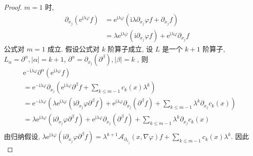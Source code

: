 \documentclass[11pt]{ctexart}[UTF8]
\begin{document}
\begin{proof}
    $m=1$ 时, 
    \begin{equation*}
        \begin{aligned}
            \partial_{x_j} \left( \mathrm{e}^{\mathrm{i} \lambda \varphi} f \right) & = \mathrm{e}^{\mathrm{i} \lambda \varphi} \left( \mathrm{i} \lambda \partial_{x_j} \varphi f + \partial_{x_j} f \right) \\
            & = \lambda \mathrm{e}^{\mathrm{i} \lambda \varphi} \left( \mathrm{i} \partial_{x_j} \varphi f \right) + \mathrm{e}^{\mathrm{i} \lambda \varphi} \partial_{x_j} f
        \end{aligned}
    \end{equation*}
    公式对 $m=1$ 成立. 假设公式对 $k$ 阶算子成立, 设 $L$ 是一个 $k+1$ 阶算子, $L_{\alpha} = \partial^{\alpha}, |\alpha| = k+1$,
     $\partial^{\alpha} = \partial_{x_{j}}(\partial^{\beta}), |\beta| = k$ , 则
    \begin{equation*}        
        \begin{aligned}
            &\mathrm{e}^{-\mathrm{i} \lambda \varphi} \partial^{\alpha} \left( \mathrm{e}^{\mathrm{i} \lambda \varphi} f \right) \\
            & = \mathrm{e}^{-\mathrm{i} \lambda \varphi} \partial_{x_{j}} \left( \mathrm{e}^{\mathrm{i} \lambda \varphi} \partial^{\beta} f + \sum\limits_{k \leq m-1} c_{k}(x) \lambda^k \right) \\
            & = \mathrm{e}^{-\mathrm{i} \lambda \varphi} \left( \lambda \mathrm{e}^{\mathrm{i} \lambda \varphi} \left( \mathrm{i} \partial_{x_j} \varphi \partial^{\beta} f \right) + \mathrm{e}^{\mathrm{i} \lambda \varphi} \partial_{x_j} \left( \partial^{\beta} f \right) + \sum\limits_{k \leq m-1} \lambda^k \partial_{x_j} c_{k}(x) \right) \\
            & = \lambda \mathrm{e}^{\mathrm{i} \lambda \varphi} \left( \mathrm{i} \partial_{x_j} \varphi \partial^{\beta} f \right) + \mathrm{e}^{\mathrm{i} \lambda \varphi} \partial_{x_j} \left( \partial^{\beta} f \right) + \sum\limits_{k \leq m -1} \lambda^k \partial_{x_j} c_{k}(x) \\    
        \end{aligned}
    \end{equation*}
    由归纳假设, $\lambda \mathrm{e}^{\mathrm{i} \lambda \varphi} \left( \mathrm{i} \partial_{x_j} \varphi \partial^{\beta} f \right) = \lambda^{k+1} \mathscr{A}_{\partial_{x_j}}(x, \nabla \varphi) f + \sum\limits_{k \leq m-1} c_{k}(x) \lambda^k$. 因此
    \begin{equation*}

\end{equation*}
\end{proof}
\end{document}
